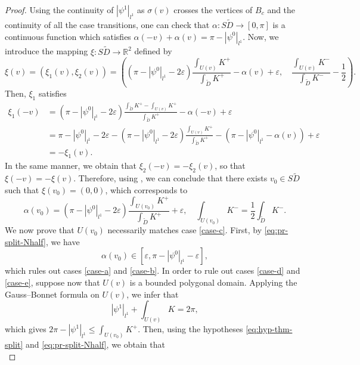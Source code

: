 \documentclass{article}
\newcommand{\R}{\mathbb{R}}
\newcommand{\halfP}{B}
\theoremstyle{remark}
\theoremstyle{prpart}
\begin{document}
\begin{proof}
Using the continuity of $|\psi^1|_{l^1}$ as $\sigma(v)$ crosses the vertices of $\halfP_c$ and the continuity of all the case transitions, one can check that $\alpha : S\tilde D\to [0,\pi]$ is a continuous function which satisfies $\alpha(-v)+\alpha(v) = \pi-|\psi^0|_{l^1}$. Now, we introduce the mapping $\xi : S\tilde D\to\R^2$ defined by 
\begin{equation*}
\xi(v) = (\xi_1(v),\xi_2(v)) = \left((\pi-|\psi^0|_{l^1}-2\varepsilon)\frac{\int_{U(v)}K^+}{\int_{\tilde D}K^+}-\alpha(v)+\varepsilon,\quad \frac{\int_{U(v)}K^-}{\int_{\tilde D}K^-}-\frac{1}{2}\right).
\end{equation*}
Then, $\xi_1$ satisfies
\begin{align*}
  \xi_1(-v) &= (\pi-|\psi^0|_{l^1} -2\varepsilon)\frac{\int_{\tilde D}K^+ - \int_{U(v)}K^+}{\int_{\tilde D}K^+} - \alpha(-v) + \varepsilon\\
  &= \pi-|\psi^0|_{l^1} -2\varepsilon - (\pi-|\psi^0|_{l^1} -2\varepsilon)\frac{\int_{U(v)}K^+}{\int_{\tilde D}K^+} - (\pi-|\psi^0|_{l^1} - \alpha(v)) + \varepsilon\\
  &= -\xi_1(v).
\end{align*}
In the same manner, we obtain that $\xi_2(-v) = -\xi_2(v)$, so that $\xi(-v) = -\xi(v)$.
Therefore, using \cite[Prop. 1]{Bur05}, we can conclude that there exists $v_0\in S\tilde D$ such that $\xi(v_0) = (0,0)$, which corresponds to
\begin{equation}\label{eq:pr-split-Nhalf}
  \alpha(v_0) = (\pi-|\psi^0|_{l^1}-2\varepsilon)\frac{\int_{U(v_0)}K^+}{\int_{\tilde D}K^+}+\varepsilon,
\quad\int_{U(v_0)} K^- = \frac{1}{2}\int_{\tilde D} K^-.
\end{equation}
 We now prove that $U(v_0)$ necessarily matches case \ref{case-c}. First, by \eqref{eq:pr-split-Nhalf}, we have 
\begin{equation}\label{eq:pr-split-Nhalf2}
\alpha(v_0)\in[\varepsilon,\pi-|\psi^0|_{l^1}-\varepsilon],
\end{equation}
which rules out cases \ref{case-a} and \ref{case-b}. In order to rule out cases \ref{case-d} and \ref{case-e}, suppose now that $U(v)$ is a bounded polygonal domain. Applying the Gauss--Bonnet formula on $U(v)$, we infer that
\begin{equation*}
  |\psi^1|_{l^1}+\int_{U(v)}K = 2\pi,
\end{equation*}
which gives $2\pi - |\psi^1|_{l^1} \leq \int_{U(v_0)} K^+$. Then, using the hypotheses \eqref{eq:hyp-thm-split} and \eqref{eq:pr-split-Nhalf}, we obtain that
\begin{equation}\label{eq:pr-split-Nhalf3}

\end{equation}
\end{proof}
\end{document}
